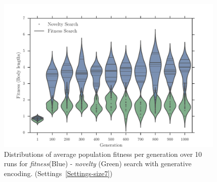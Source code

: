 \begin{figure}[t!]
\centering
\includegraphics[width=1.0\textwidth]{../Figures/Results/ViolinPlotsAvgGenFitSize7.pdf}
\caption{Distributions of average population fitness per generation over 10 runs for \emph{fitness}(Blue) - \emph{novelty} (Green) search with generative encoding. (Settings~\ref{Settings-size7})}
\label{fig:ViolinPlotsAvgGenFitSize7}
\end{figure}

